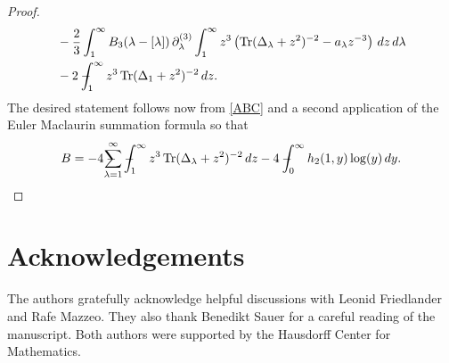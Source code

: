 \begin{proof}
\begin{equation}
\begin{split}
&-\frac{2}{3} \int_1^\infty B_3(\lambda-[\lambda]) \, \partial_\lambda^{(3)} 
\int_1^\infty z^3 \left( \operatorname{Tr}(\Delta_\lambda + z^2)^{-2} - a_\lambda z^{-3}\right) \, dz \, d\lambda \\
& - 2 -\hspace*{-1em}\int_1^\infty z^3 \operatorname{Tr}(\Delta_1 + z^2)^{-2} \, dz.
\end{split}
\end{equation}
The desired statement follows now from \eqref{ABC} 
and a second application of the Euler Maclaurin summation formula 
so that 
\begin{align}
B = - 4 \regsum_{\lambda=1}^\infty \regint_1^\infty z^3 \Tr(\Delta_\lambda + z^2)^{-2}  \, dz
- 4 \regint_0^\infty h_{2}(1,y)\log(y)\, dy.
\end{align}
\end{proof}


\section*{Acknowledgements}
The authors gratefully acknowledge helpful discussions with Leonid Friedlander and Rafe Mazzeo. 
They also thank Benedikt Sauer for a careful reading of the manuscript.
Both authors were supported by the Hausdorff Center for Mathematics.




\listoffigures




